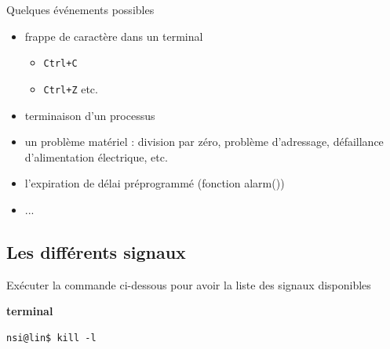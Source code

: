 \documentclass[10pt,french,A4]{article}
\theoremstyle{plain}
\newenvironment{code}[1]{%
    \begin{bclogo}[couleur=backcolour, couleurTexte=black ,couleurBord=blue ,couleurBarre=black, ombre=false,epBord=0.9,logo=\#,arrondi=0.1]{{\bfseries #1}}%
    }%
    {%
    \end{bclogo}
}%
\begin{document}
Quelques événements possibles
\begin{itemize}
    \item frappe de caractère dans un terminal
    \begin{itemize}
        \item  \texttt{Ctrl+C} 
        \item \texttt{Ctrl+Z} etc.
    \end{itemize}
    \item terminaison d'un processus
    \item un problème matériel : division par zéro, problème d'adressage, défaillance d'alimentation électrique, etc.
    \item l'expiration de délai préprogrammé (fonction alarm())
    \item ...
\end{itemize}

\hypertarget{}{%
\subsection{Les différents signaux}\label{schuxe9ma-2}}
Exécuter la commande ci-dessous pour avoir la liste des signaux disponibles
\begin{code}{terminal}
    \begin{verbatim}
nsi@lin$ kill -l
    \end{verbatim}
\end{code}
\end{document}
